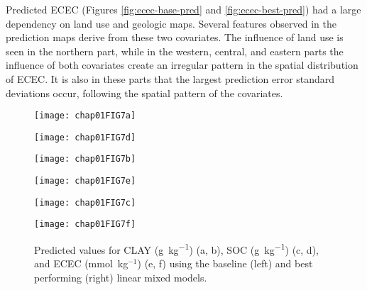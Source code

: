 Predicted ECEC (Figures \ref{fig:ecec-base-pred} and \ref{fig:ecec-best-pred}) had a large dependency on land 
use and geologic maps. Several features observed in the prediction maps derive from these two covariates. The 
influence of land use is seen in the northern part, while in the western, central, and eastern parts the 
influence of both covariates create an irregular pattern in the spatial distribution of ECEC. It is also in 
these parts that the largest prediction error standard deviations occur, following the spatial pattern of the 
covariates.

 \begin{figure}[!ht]
    \centering
    \begin{minipage}[b]{63mm}
      \subcaption{}
      \label{fig:clay-base-pred}
      \centering
      \texttt{[image: chap01FIG7a]}
    \end{minipage}
    \begin{minipage}[b]{63mm}
      \subcaption{}
      \label{fig:clay-best-pred}
      \centering
      \texttt{[image: chap01FIG7d]}
    \end{minipage}
    \begin{minipage}[b]{63mm}
      \subcaption{}
      \label{fig:soc-base-pred}
      \centering
      \texttt{[image: chap01FIG7b]}
    \end{minipage}
    \begin{minipage}[b]{63mm}
      \subcaption{}
      \label{fig:soc-best-pred}
      \centering
      \texttt{[image: chap01FIG7e]}
    \end{minipage}
    \begin{minipage}[b]{63mm}
      \subcaption{}
      \label{fig:ecec-base-pred}
      \centering
      \texttt{[image: chap01FIG7c]}
    \end{minipage}
    \begin{minipage}[b]{63mm}
      \subcaption{}
      \label{fig:ecec-best-pred}
      \centering
      \texttt{[image: chap01FIG7f]}
    \end{minipage}
  \caption{Predicted values for CLAY (\si{\gram\per\kilo\gram}) (a, b), SOC (\si{\gram\per\kilo\gram}) (c, d), 
and ECEC (mmol~kg$^{-1}$) (e, f) using the baseline (left) and best performing (right) linear mixed models.}
  \label{fig:kriging}
\end{figure}

